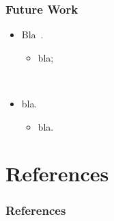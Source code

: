 \documentclass{beamer}
\begin{document}
\begin{frame}
  \frametitle{Future Work}

  \begin{itemize}
    \item Bla~\cite{rabiner_fundamentals_1993}.
      \begin{itemize}
        \item bla; 
      \end{itemize}
      ~

    \item bla.
      \begin{itemize}
        \item bla.
      \end{itemize}
  \end{itemize}
\end{frame}


\appendix
\section*{References}
\begin{frame}[allowframebreaks]
  \frametitle{References}
  {\footnotesize
    
      
  }
\end{frame}
\end{document}
